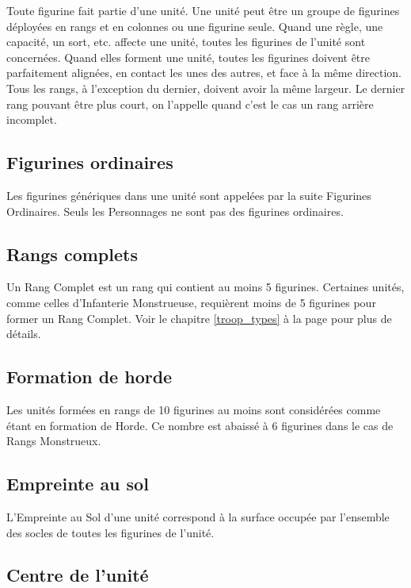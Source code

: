 Toute figurine fait partie d'une unité. Une unité peut être un groupe de figurines déployées en rangs et en colonnes ou une figurine seule. Quand une règle, une capacité, un sort, etc. affecte une unité, toutes les figurines de l'unité sont concernées. Quand elles forment une unité, toutes les figurines doivent être parfaitement alignées, en contact les unes des autres, et face à la même direction. Tous les rangs, à l'exception du dernier, doivent avoir la même largeur. Le dernier rang pouvant être plus court, on l'appelle quand c'est le cas un rang arrière incomplet. 

\subsection{Figurines ordinaires}

Les figurines génériques dans une unité sont appelées par la suite Figurines Ordinaires. Seuls les Personnages ne sont pas des figurines ordinaires.

\subsection{Rangs complets}

Un Rang Complet est un rang qui contient au moins 5 figurines. Certaines unités, comme celles d'Infanterie Monstrueuse, requièrent moins de 5 figurines pour former un Rang Complet. Voir le chapitre \ref{troop_types} à la page \pageref{troop_types} pour plus de détails.

\subsection{Formation de horde}
\label{horde}

Les unités formées en rangs de 10 figurines au moins sont considérées comme étant en formation de Horde. Ce nombre est abaissé à 6 figurines dans le cas de Rangs Monstrueux.

\subsection{Empreinte au sol}

L'Empreinte au Sol d'une unité correspond à la surface occupée par l'ensemble des socles de toutes les figurines de l'unité.

\subsection{Centre de l'unité}
\label{centre_unite}

